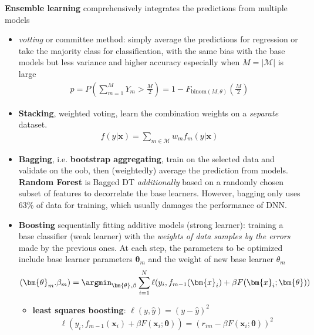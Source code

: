 \textbf{Ensemble learning} comprehensively integrates the predictions from multiple models
\begin{itemize}
    \item \textit{votting} or committee method: simply average the predictions for regression or take the majority class for classification, with the same bias with the base models but less variance and higher accuracy especially when $M=|\mathcal{M}|$ is large 
    \begin{gather}
        p=P(\sum_{m=1}^M Y_m>\frac{M}{2})=1-F_{\text{binom}(M,\theta)}(\frac{M}{2})
    \end{gather}
    
    \item \textbf{Stacking}, weighted voting, learn the combination weights on a \textit{separate} dataset.
    \begin{gather}
        f(y|\bm{x}) = \sum_{m\in\mathcal{M}}w_mf_m(y|\bm{x})
    \end{gather}
    
    \item \textbf{Bagging}, i.e. \textbf{bootstrap aggregating}, train on the selected data 
    and validate on the oob, then (weightedly) average the prediction from models.
    \textbf{Random Forest} is Bagged DT \textit{additionally} based on a randomly chosen subset of features to decorrelate the base learners.
    However, bagging only uses 63\% of data for training, which usually damages the performance of DNN.

    \item \textbf{Boosting} sequentially fitting additive models (strong learner): training a base classifier (weak learner) with the \textit{weights of data samples by the errors} made by the previous ones. At each step, the parameters to be optimized include base learner parameters $\bm{\theta}_m$ and the weight of new base learner $\theta_m$ 
    \begin{gather}
        (\bm{\theta}_m.\beta_m)=\argmin_{\bm{\theta}, \beta}\sum_{i=1}^{N}\ell(y_i,f_{m-1}(\bm{x}_i)+\beta F(\bm{x}_i;\bm{\theta}))
    \end{gather}
    \begin{itemize}
        \item \textbf{least squares boosting}: $\ell(y,\hat{y}) = (y-\hat{y})^2$
        \begin{gather}
            \ell(y_i,f_{m-1}(\bm{x}_i)+\beta F(\bm{x}_i;\bm{\theta})) = (r_{im}-\beta F(\bm{x}_i;\bm{\theta}))^2
        \end{gather}


\end{itemize}
\end{itemize}
